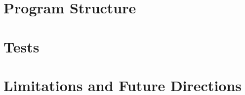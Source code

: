 







\chapter{Program Structure}
\label{sec:structure}









\clearpage







\clearpage



\clearpage


\chapter{Tests}
\label{sec:tests}







\chapter{Limitations and Future Directions}
\label{sec:future}



